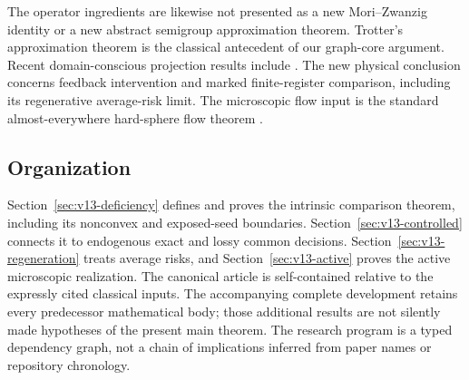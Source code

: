 The operator ingredients are likewise not presented as a new
Mori--Zwanzig identity or a new abstract semigroup approximation theorem.
Trotter's approximation theorem \cite[Theorem~5.2]{Trotter1958} is the
classical antecedent of our graph-core argument. Recent domain-conscious
projection results include \cite{WidderZimmerSchilling2025,WidderSchilling2026}.
The new physical conclusion concerns feedback intervention and marked
finite-register comparison, including its regenerative average-risk
limit. The microscopic flow input is the standard almost-everywhere
hard-sphere flow theorem \cite{GallagherSaintRaymondTexier}.

\subsection{Organization}
Section~\ref{sec:v13-deficiency} defines and proves the intrinsic
comparison theorem, including its nonconvex and exposed-seed boundaries.
Section~\ref{sec:v13-controlled} connects it to endogenous exact and lossy
common decisions. Section~\ref{sec:v13-regeneration} treats average risks,
and Section~\ref{sec:v13-active} proves the active microscopic realization.
The canonical article is self-contained relative to the expressly cited
classical inputs. The accompanying complete development retains every
predecessor mathematical body; those additional results are not silently
made hypotheses of the present main theorem. The research program is a
typed dependency graph, not a chain of implications inferred from paper
names or repository chronology.
